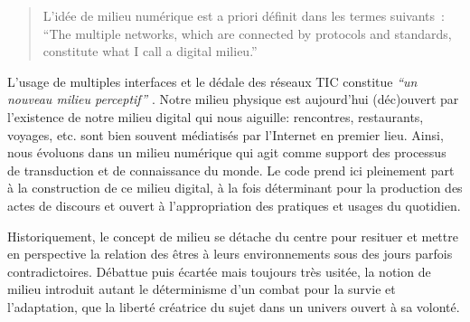\begin{quote}
L’idée de milieu numérique est a priori définit dans les termes suivants : 
“The multiple networks, which are connected by protocols and standards, constitute what I call a digital milieu.” \citep{Hui2012}
\end{quote}

L’usage de multiples interfaces et le dédale des réseaux TIC constitue \textit{“un nouveau milieu perceptif”} \citep{Barboza2006}. Notre milieu physique est aujourd’hui (déc)ouvert par l’existence de notre milieu digital qui nous aiguille: rencontres, restaurants, voyages, etc. sont bien souvent médiatisés par l’Internet en premier lieu. Ainsi, nous évoluons dans un milieu numérique qui agit comme support des processus de transduction et de connaissance du monde. Le code prend ici pleinement part à la construction de ce milieu digital, à la fois déterminant pour la production des actes de discours et ouvert à l’appropriation des pratiques et usages du quotidien.

Historiquement, le concept de milieu se détache du centre pour resituer et mettre en perspective la relation des êtres à leurs environnements sous des jours parfois contradictoires. Débattue puis écartée mais toujours très usitée, la notion de milieu introduit autant le déterminisme d’un combat pour la survie et l’adaptation, que la liberté créatrice du sujet dans un univers ouvert à sa volonté. 


